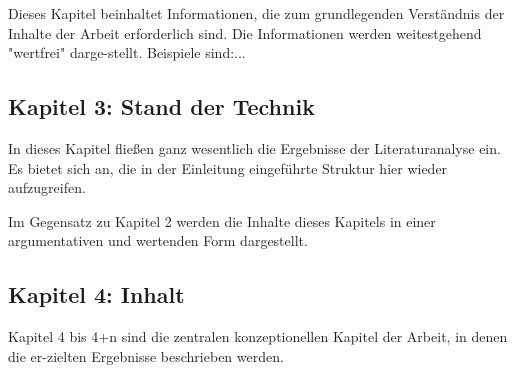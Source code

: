 Dieses Kapitel beinhaltet Informationen, die zum grundlegenden Verständnis der Inhalte der Arbeit erforderlich sind. Die Informationen werden weitestgehend "wertfrei" darge-stellt. Beispiele sind:...

\subsection*{Kapitel 3: Stand der Technik}

In dieses Kapitel fließen ganz wesentlich die Ergebnisse der Literaturanalyse ein. Es bietet sich an, die in der Einleitung eingeführte Struktur hier wieder aufzugreifen.

Im Gegensatz zu Kapitel 2 werden die Inhalte dieses Kapitels in einer argumentativen und wertenden Form dargestellt.

\subsection*{Kapitel 4: Inhalt}

Kapitel 4 bis 4+n sind die zentralen konzeptionellen Kapitel der Arbeit, in denen die er-zielten Ergebnisse beschrieben werden.
